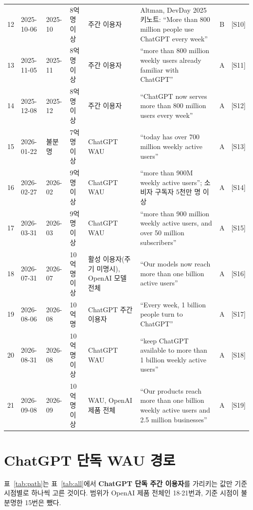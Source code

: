 \documentclass[11pt]{article}
\begin{document}
{\begin{longtable}{@{}r L{1.55cm} L{1.6cm} L{1.35cm} L{2.6cm} L{5.2cm} c L{1.15cm}@{}}
12 & 2025-10-06 & 2025-10 & 8억 명 이상 & 주간 이용자 & Altman, DevDay 2025 키노트: ``More than 800 million people use ChatGPT every week'' & B & [S10] \\
13 & 2025-11-05 & 2025-11 & 8억 명 이상 & 주간 이용자 & ``more than 800 million weekly users already familiar with ChatGPT'' & A & [S11] \\
14 & 2025-12-08 & 2025-12 & 8억 명 이상 & 주간 이용자 & ``ChatGPT now serves more than 800 million users every week'' & A & [S12] \\
15 & 2026-01-22 & 불분명 & 7억 명 이상 & ChatGPT WAU & ``today has over 700 million weekly active users'' & A & [S13] \\
16 & 2026-02-27 & 2026-02 & 9억 명 이상 & ChatGPT WAU & ``more than 900M weekly active users''; 소비자 구독자 5천만 명 이상 & A & [S14] \\
17 & 2026-03-31 & 2026-03 & 9억 명 이상 & ChatGPT WAU & ``more than 900 million weekly active users, and over 50 million subscribers'' & A & [S15] \\
18 & 2026-07-31 & 2026-07 & 10억 명 이상 & 활성 이용자(주기 미명시), OpenAI 모델 전체 & ``Our models now reach more than one billion active users'' & A & [S16] \\
19 & 2026-08-06 & 2026-08 & 10억 명 & ChatGPT 주간 이용자 & ``Every week, 1 billion people turn to ChatGPT'' & A & [S17] \\
20 & 2026-08-31 & 2026-08 & 10억 명 이상 & ChatGPT WAU & ``keep ChatGPT available to more than 1 billion weekly active users'' & A & [S18] \\
21 & 2026-09-08 & 2026-09 & 10억 명 이상 & WAU, OpenAI 제품 전체 & ``Our products reach more than one billion weekly active users and 2.5 million businesses'' & A & [S19] \\
\end{longtable}
}

\section{ChatGPT 단독 WAU 경로}

표~\ref{tab:path}는 표~\ref{tab:all}에서 \textbf{ChatGPT 단독 주간 이용자}를 가리키는 값만 기준 시점별로 하나씩 고른 것이다. 범위가 OpenAI 제품 전체인 18$\cdot$21번과, 기준 시점이 불분명한 15번은 뺐다.
\end{document}
